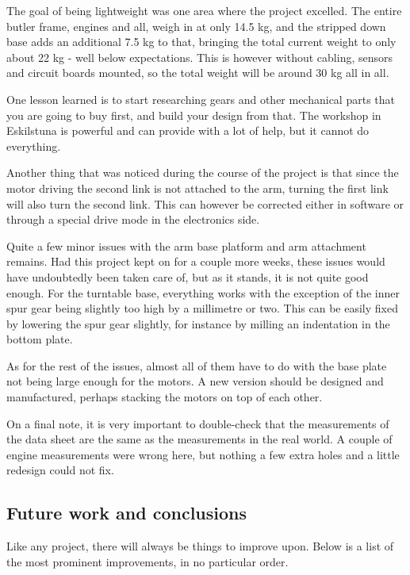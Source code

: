 The goal of being lightweight was one area where the project excelled. The entire butler frame, engines and all, weigh in at only 14.5 kg, and the stripped down base adds an additional 7.5 kg to that, bringing the total current weight to only about 22 kg - well below expectations. This is however without cabling, sensors and circuit boards mounted, so the total weight will be around 30 kg all in all.

One lesson learned is to start researching gears and other mechanical parts that you are going to buy first, and build your design from that. The workshop in Eskilstuna is powerful and can provide with a lot of help, but it cannot do everything.

Another thing that was noticed during the course of the project is that since the motor driving the second link is not attached to the arm, turning the first link will also turn the second link. This can however be corrected either in software or through a special drive mode in the electronics side.

Quite a few minor issues with the arm base platform and arm attachment remains. Had this project kept on for a couple more weeks, these issues would have undoubtedly been taken care of, but as it stands, it is not quite good enough. For the turntable base, everything works with the exception of the inner spur gear being slightly too high by a millimetre or two. This can be easily fixed by lowering the spur gear slightly, for instance by milling an indentation in the bottom plate. 

As for the rest of the issues, almost all of them have to do with the base plate not being large enough for the motors. A new version should be designed and manufactured, perhaps stacking the motors on top of each other.

On a final note, it is very important to double-check that the measurements of the data sheet are the same as the measurements in the real world. A couple of engine measurements were wrong here, but nothing a few extra holes and a little redesign could not fix.



\subsection{Future work and conclusions}

Like any project, there will always be things to improve upon. Below is a list of the most prominent improvements, in no particular order. 

